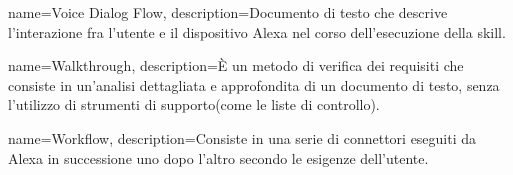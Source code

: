 {
name={Voice Dialog Flow},
description={Documento di testo che descrive l'interazione fra l'utente e il dispositivo Alexa nel corso dell'esecuzione della skill.}
}

{
name={Walkthrough},
description={È un metodo di verifica dei requisiti che consiste in un'analisi dettagliata e approfondita di un documento di testo, senza l'utilizzo di strumenti di supporto(come le liste di controllo).}
}

{
name={Workflow},
description={Consiste in una serie di connettori eseguiti da Alexa in successione uno dopo l'altro secondo le esigenze dell'utente. }
}